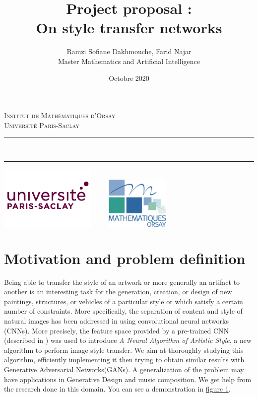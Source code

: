 \documentclass[final]{cvpr}
\newcommand{\HRule}{\rule{\linewidth}{0.5mm}}
\begin{document}
	\title{Project proposal :\\On style transfer networks\\}
	\author{
		Ramzi Sofiane Dakhmouche, Farid Najar\\[0.2cm]
		Master Mathematics and Artificial Intelligence}
	\date{Octobre 2020}
	\makeatletter
	\begin{titlepage}
		\centering
		\textsc{\LARGE Institut de Mathématiques d'Orsay \\ Université Paris-Saclay}\\[4cm]
		\HRule \\
		{ \huge \bfseries \@title[2cm] }
		\begin{Large}
			\@author
		\end{Large}
		\HRule
		\vfill
		\includegraphics[width=0.35\textwidth]{paris-saclay.png}
		\hfill
		\includegraphics[width=0.35\textwidth, height=2.5cm]{imo.png}
		\pagebreak
		\pagebreak
	\end{titlepage}


	\section*{Motivation and problem definition}
	Being able to transfer the style of an artwork or more generally an artifact to another is an interesting task for the generation, creation, or design of new paintings, structures, or vehicles of a particular style or which satisfy a certain number of constraints. More specifically, the separation of content and style of natural images has been addressed in \cite{1} using convolutional neural networks (CNNs). More precisely, the feature space provided by a pre-trained CNN (described in \cite{2}) was used to introduce \emph{A Neural Algorithm of Artistic Style}, a new algorithm to perform image style transfer. We aim at thoroughly  studying this algorithm, efficiently implementing it then trying to obtain similar results with Generative Adversarial Networks(GANs). A generalization of the problem may have applications in Generative Design\cite{7} and music composition. We get help from the research done in this domain\cite{1}\cite{2}\cite{4}. You can see a demonstration in \hyperref[example]{figure 1}.
	
\end{document}
